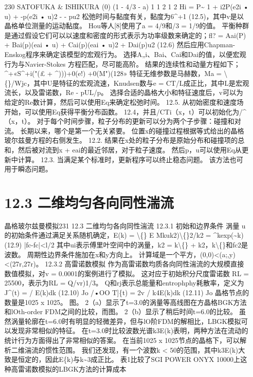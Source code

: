 \documentclass[UTF8,11pt,a4paper,openany,fontset=fandol]{ctexbook}
\begin{document}
230 SATOFUKA \& ISHIKURA (0) (1 - 4/3 - a) 1 1 2 1 2 Hi = P\textasciitilde{} 1 + i2P(e2i • u) + -p(e2i • u)2 - - pu2 松弛时间与黏度有关，黏度为6\textasciicircum{}+1 (12.5)，其中v是以晶格单位测量的运动黏度。 Hou等人[8]使用了a = 4/9和/3 = 1/9的值。 平衡种群是通过假设它们可以以速度和密度的形式表示为功率级数来确定的；fl? = Aai(P) + Bai(p)(eai • u) + Cai(p)(eai • u)2 + Dai(p)u2 (12.6) 然后应用Chapman-Enskog程序来确定该模型的宏观行为。 选择A„i、Bai、Cai和Dai的值，以便宏观行为与Navier-Stokes 方程匹配，尽可能高阶。 结果的连续性和动量方程如下；\textasciicircum{}+«S\textasciicircum{}+i("(£ + \textasciicircum{})))+0(e!) +0(M")(128» 特征无维参数是马赫数，Ma = \textbackslash\{\}/Wjc，其中U是特征的宏观流速，Knudsen数与e = CT/L成正比，其中L是宏观流长，以及雷诺数，Re - pUL/p。 选择合适的晶格大小和特征速度后，v可以为给定的Re数计算，然后可以使用Eq来确定松弛时间。 12.5. 从初始密度和速度场开始，可以使用Eq获得平衡分布函数。 12.4，并且/CTi（x，t）可以初始化为/\textasciicircum{}（x，t）。 对于每个时间步骤，粒子分布的更新可以分为两个子步骤：碰撞和对流。 长期以来，哪个是第一个无关紧要。 位置x的碰撞过程根据等式给出的晶格玻尔兹曼方程的右侧发生。 12.2. 结果在x处的粒子分布是原始分布和碰撞项的总和，然后被对流到x + eai的最近邻居，对于粒子速度。 然后p，u可以使用Eq从更新中计算。 12.3. 当满足某个标准时，更新程序可以终止稳态问题。 该方法也可用于瞬态问题。

\section{12.3 二维均匀各向同性湍流}
晶格玻尔兹曼模拟231 12.3 二维均匀各向同性湍流 12.3.1 初始和边界条件 涡量 u的初始条件通过满足关系随机确定，E(k) = \textbackslash\{\} E Mkuk2)\textbackslash\{\}2/k2 = \textasciicircum{}kexp(\textasciitilde{}k) (12.9) |fc-fc|<l/2 其中ui表示傅里叶空间中的涡量，k2 = k\textbackslash\{\} + k2，k\textbackslash\{\}和fc2是波数。 周期性边界条件施加在x和y方向上。 计算域是一个平方，(0,0)<(a;,y)<(27r,27r)。 12.3.2 高雷诺数模拟 作为高雷诺数均质各向同性湍流的大规模直接数值模拟，对v = 0.0001的案例进行了模拟。 这对应于初始积分尺度雷诺数 RL = 25500，表示为RL = Q/vr)1/3。 Q和rj表示总能量和entrophphy耗散率，定义为J\textasciicircum{}(t) = / E(k)dk (12.10) Jo /•OO T]\{t) = 2v / k4E(k)dk (12.11) Jo 晶格节点的数量是1025 x 1025。 图。 2（a）显示了t=3.0的涡量等高线图在方晶格BGK方法和lOth-order FDM之间的比较，而图。 2（b）显示了稍后时间t=6.0的比较。 虽然涡量轮廓在t=6.0时有明显的轻微差异，但与lO阶FDM的解相比，LBGK模拟可以发现非常相似的特征。 在t=3.0时比较波数光谱k3E(k)表明，两种方法在流动的统计行为方面得出了非常相似的答案。 在当前1025 x 1025节点的晶格下，可以解析二维湍流的惯性范围。 我们还发现，有一个波数k < 50的范围，其中k3E(k)大致是恒定的，因此E\{k)与k\textasciitilde{}3成正比。 表1比较了SGI POWER ONYX 10000上这种高雷诺数模拟的LBGK方法的计算成本
\end{document}
